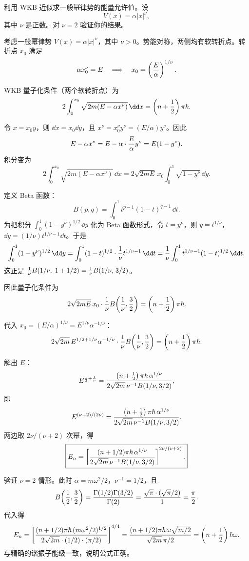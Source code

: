 \begin{question}
利用 WKB 近似求一般幂律势的能量允许值。设
\[
V(x)=\alpha |x|^\nu,
\]
其中 $\nu$ 是正数。对 $\nu=2$ 验证你的结果。
\end{question}
\begin{solution}
考虑一般幂律势 $V(x)=\alpha|x|^\nu$，其中 $\nu>0$。势能对称，两侧均有软转折点。转折点 $x_0$ 满足
\[
\alpha x_0^\nu=E\quad\Longrightarrow\quad x_0=\left({E\over\alpha}\right)^{1/\nu}.
\]

WKB 量子化条件（两个软转折点）为
\[
2\int_0^{x_0}\sqrt{2m(E-\alpha x^\nu)}\,\dd x
=\left(n+{1\over2}\right)\pi\hbar.
\]

令 $x=x_0 y$，则 $\dd x=x_0\dd y$，且 $x^\nu=x_0^\nu y^\nu=(E/\alpha)y^\nu$。因此
\[
E-\alpha x^\nu=E-\alpha\cdot{E\over\alpha}y^\nu=E(1-y^\nu).
\]
积分变为
\[
2\int_0^{x_0}\sqrt{2m(E-\alpha x^\nu)}\,\dd x
=2\sqrt{2mE}\,x_0\int_0^1\sqrt{1-y^\nu}\,\dd y.
\]

定义 Beta 函数：
\[
B(p,q)=\int_0^1 t^{p-1}(1-t)^{q-1}\,\dd t.
\]
为把积分 $\int_0^1(1-y^\nu)^{1/2}\,\dd y$ 化为 Beta 函数形式，令 $t=y^\nu$，则 $y=t^{1/\nu}$，$\dd y=(1/\nu)t^{1/\nu-1}\dd t$。于是
\[
\int_0^1(1-y^\nu)^{1/2}\,\dd y
=\int_0^1(1-t)^{1/2}\cdot{1\over\nu}t^{1/\nu-1}\,\dd t
={1\over\nu}\int_0^1 t^{1/\nu-1}(1-t)^{1/2}\,\dd t.
\]
这正是 ${1\over\nu}B(1/\nu,\;1+1/2)={1\over\nu}B(1/\nu,\,3/2)$。

因此量子化条件为
\[
2\sqrt{2mE}\,x_0\cdot{1\over\nu}B\!\left({1\over\nu},{3\over2}\right)
=\left(n+{1\over2}\right)\pi\hbar.
\]

代入 $x_0=(E/\alpha)^{1/\nu}=E^{1/\nu}\alpha^{-1/\nu}$：
\[
2\sqrt{2m}\,E^{1/2+1/\nu}\alpha^{-1/\nu}
\cdot{1\over\nu}B\!\left({1\over\nu},{3\over2}\right)
=\left(n+{1\over2}\right)\pi\hbar.
\]

解出 $E$：
\[
E^{{1\over2}+{1\over\nu}}
={\left(n+{1\over2}\right)\pi\hbar\,\alpha^{1/\nu}\over
2\sqrt{2m}\,\nu^{-1}B(1/\nu,3/2)},
\]
即
\[
E^{(\nu+2)/(2\nu)}
={\left(n+{1\over2}\right)\pi\hbar\,\alpha^{1/\nu}\over
2\sqrt{2m}\,\nu^{-1}B(1/\nu,3/2)}.
\]
两边取 $2\nu/(\nu+2)$ 次幂，得
\[
\boxed{E_n=\left[{(n+1/2)\pi\hbar\,\alpha^{1/\nu}\over
2\sqrt{2m}\,\nu^{-1}B(1/\nu,3/2)}\right]^{2\nu/(\nu+2)}.}
\]

验证 $\nu=2$ 情形。此时 $\alpha=m\omega^2/2$，$\nu^{-1}=1/2$，且
\[
B\!\left({1\over2},{3\over2}\right)
={\Gamma(1/2)\Gamma(3/2)\over\Gamma(2)}
={\sqrt\pi\cdot(\sqrt\pi/2)\over1}={\pi\over2}.
\]
代入得
\[
E_n=\left[{(n+1/2)\pi\hbar\,(m\omega^2/2)^{1/2}\over
2\sqrt{2m}\cdot(1/2)\cdot(\pi/2)}\right]^{4/4}
={(n+1/2)\pi\hbar\,\omega\sqrt{m/2}\over
\sqrt{2m}\,\pi/2}
=\left(n+{1\over2}\right)\hbar\omega.
\]
与精确的谐振子能级一致，说明公式正确。
\end{solution}

